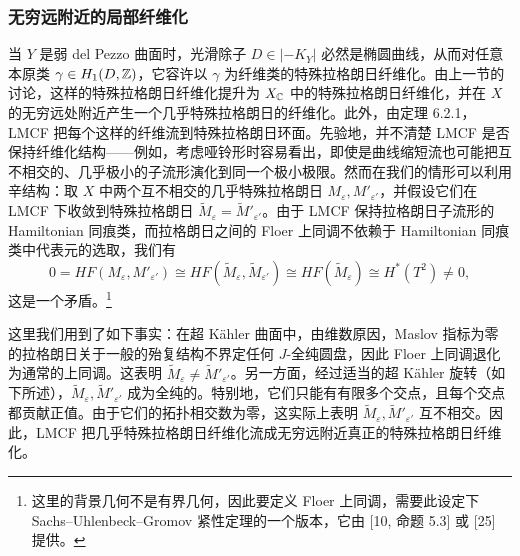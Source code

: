 \subsubsection{无穷远附近的局部纤维化}
当 $Y$ 是弱 del Pezzo 曲面时，光滑除子 $D\in|-K_Y|$ 必然是椭圆曲线，从而对任意本原类 $\gamma\in H_1(D,\mathbb{Z})$，它容许以 $\gamma$ 为纤维类的特殊拉格朗日纤维化。由上一节的讨论，这样的特殊拉格朗日纤维化提升为 $X_{\mathbb{C}}$ 中的特殊拉格朗日纤维化，并在 $X$ 的无穷远处附近产生一个几乎特殊拉格朗日的纤维化。此外，由定理 6.2.1，LMCF 把每个这样的纤维流到特殊拉格朗日环面。先验地，并不清楚 LMCF 是否保持纤维化结构------例如，考虑哑铃形时容易看出，即使是曲线缩短流也可能把互不相交的、几乎极小的子流形演化到同一个极小极限。然而在我们的情形可以利用辛结构：取 $X$ 中两个互不相交的几乎特殊拉格朗日 $M_\varepsilon,M'_{\varepsilon'}$，并假设它们在 LMCF 下收敛到特殊拉格朗日 $\tilde M_\varepsilon=\tilde M'_{\varepsilon'}$。由于 LMCF 保持拉格朗日子流形的 Hamiltonian 同痕类，而拉格朗日之间的 Floer 上同调不依赖于 Hamiltonian 同痕类中代表元的选取，我们有
\[
0=HF(M_\varepsilon,M'_{\varepsilon'})\cong HF(\tilde M_\varepsilon,\tilde M_{\varepsilon'})\cong HF(\tilde M_\varepsilon)\cong H^*(T^2)\neq 0,
\]
这是一个矛盾。\footnote{这里的背景几何不是有界几何，因此要定义 Floer 上同调，需要此设定下 Sachs--Uhlenbeck--Gromov 紧性定理的一个版本，它由 [10, 命题 5.3] 或 [25] 提供。}

这里我们用到了如下事实：在超 Kähler 曲面中，由维数原因，Maslov 指标为零的拉格朗日关于一般的殆复结构不界定任何 $J$-全纯圆盘，因此 Floer 上同调退化为通常的上同调。这表明 $\tilde M_\varepsilon\neq\tilde M'_{\varepsilon'}$。另一方面，经过适当的超 Kähler 旋转（如下所述），$\tilde M_\varepsilon,\tilde M'_{\varepsilon'}$ 成为全纯的。特别地，它们只能有有限多个交点，且每个交点都贡献正值。由于它们的拓扑相交数为零，这实际上表明 $\tilde M_\varepsilon,\tilde M'_{\varepsilon'}$ 互不相交。因此，LMCF 把几乎特殊拉格朗日纤维化流成无穷远附近真正的特殊拉格朗日纤维化。

